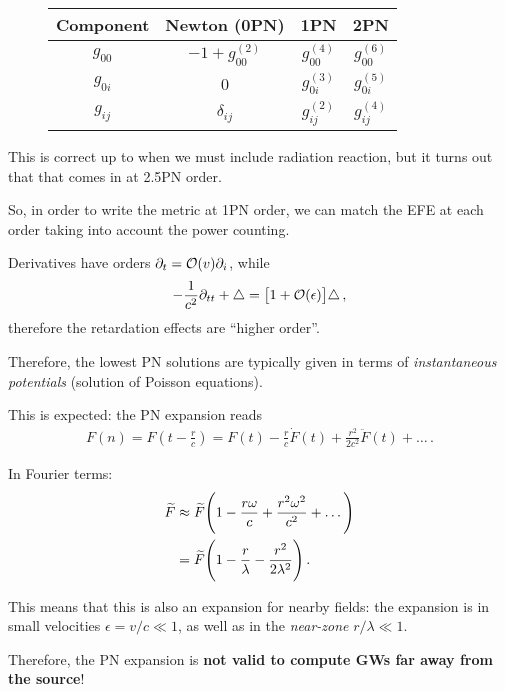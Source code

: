 \documentclass[main.tex]{subfiles}
\begin{document}
\begin{figure}
\begin{tabular}{c|ccc}
Component & Newton (0PN) & 1PN & 2PN \\
\hline
\(g_{00} \) & \(-1 + g_{00}^{(2)}\) & \(g_{00}^{(4)}\) & \(g_{00}^{(6)}\) \\
\(g_{0i}\) & 0 & \(g_{0i}^{(3)}\) & \(g_{0i}^{(5)}\) \\
\(g_{ij}\) & \(\delta_{ij}\) & \(g_{ij}^{(2)}\) & \(g_{ij}^{(4)}\) 
\end{tabular}
\label{tab:PN-orders}
\caption{}
\end{figure}

This is correct up to when we must include radiation reaction, but it turns out that that comes in at 2.5PN order. 

So, in order to write the metric at 1PN order, we can match the EFE at each order taking into account the power counting. 

Derivatives have orders \(\partial_{t} = \order{v} \partial_{i}\), while 
%
\begin{align}
- \frac{1}{c^2} \partial_{tt} + \triangle = \qty[1 + \order{\epsilon }] \triangle  
\,,
\end{align}
%
therefore the retardation effects are ``higher order''. 

Therefore, the lowest PN solutions are typically given in terms of \emph{instantaneous potentials} (solution of Poisson equations).

This is expected: the PN expansion reads 
%
\begin{align}
F(n) = F( t - \frac{r}{c}) = F(t) - \frac{r}{c} \dot{F} (t) + \frac{r^2}{2 c^2} \ddot{F}( t) + \dots 
\,.
\end{align}

In Fourier terms: 
%
\begin{align}
\widetilde{F} &\approx \widetilde{F} \qty(1 - \frac{r \omega }{c} + \frac{r^2\omega^2}{c^2} + \dots)  \\
&= \widetilde{F} \qty(1 - \frac{r}{\lambda } - \frac{r^2}{2 \lambda^2})
\,.
\end{align}
%

This means that this is also an expansion for nearby fields: the expansion is in small velocities \(\epsilon = v/c \ll 1\), as well as in the \emph{near-zone} \(r / \lambda  \ll 1\). 

Therefore, the PN expansion is \textbf{not valid to compute GWs far away from the source}! 
\end{document}
